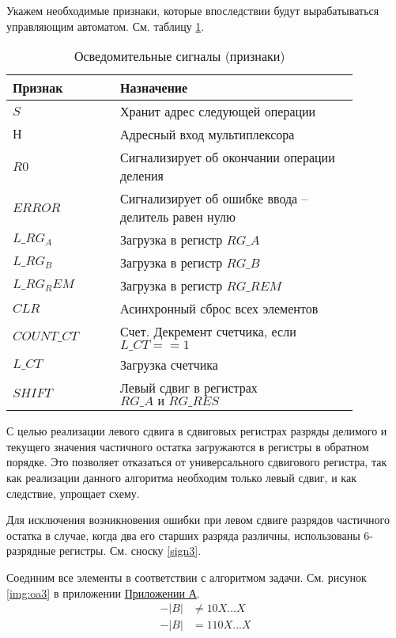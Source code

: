 \documentclass[a4paper,14pt]{extarticle}
\begin{document}
Укажем необходимые признаки, которые впоследствии будут вырабатываться управляющим автоматом. См. таблицу \ref{tab:signals3}.
\begin{table}[h!]
	\centering
	\begin{tabular}{|m{0.27\linewidth}|m{0.6\linewidth}|}
		\hline
		\textbf{Признак} & \textbf{Назначение} \\ \hline
		$S$ & Хранит адрес следующей операции \\ \hline
		$Н$ & Адресный вход мультиплексора \\ \hline
		$R0$ & Сигнализирует об окончании операции деления \\ \hline
		$ERROR$ & Сигнализирует об ошибке ввода -- делитель равен нулю \\ \hline
		$L\_RG_A$ & Загрузка в регистр $RG\_A$ \\ \hline
		$L\_RG_B$ & Загрузка в регистр $RG\_B$ \\ \hline
		$L\_RG_REM$ & Загрузка в регистр $RG\_REM$ \\ \hline
		$CLR$ & Асинхронный сброс всех элементов \\ \hline
		$COUNT\_CT$ & Счет. Декремент счетчика, если $L\_CT==1$ \\ \hline
		$L\_CT$ & Загрузка счетчика \\ \hline
		$SHIFT$ & Левый сдвиг в регистрах $RG\_A \text{ и } RG\_RES$ \\ \hline
	\end{tabular}
	\caption{Осведомительные сигналы (признаки)}
	\label{tab:signals3}
\end{table}
С целью реализации левого сдвига в сдвиговых регистрах разряды делимого и текущего значения частичного остатка загружаются в регистры в обратном порядке. Это позволяет отказаться от универсального сдвигового регистра, так как реализации данного алгоритма необходим только левый сдвиг, и как следствие, упрощает схему. 

Для исключения возникновения ошибки при левом сдвиге разрядов частичного остатка в случае, когда два его старших разряда различны, использованы 6-разрядные регистры. См. сноску \ref{sign3}.

Соединим все элементы в соответствии с алгоритмом задачи. См. рисунок \ref{img:oa3} в приложении \hyperref[tam]{Приложении А}.
\begin{equation}
\begin{aligned}
\label{sign3}
-|B| &\neq 10X...X \\
-|B| &= 110X...X
\end{aligned}
\end{equation}
\end{document}
